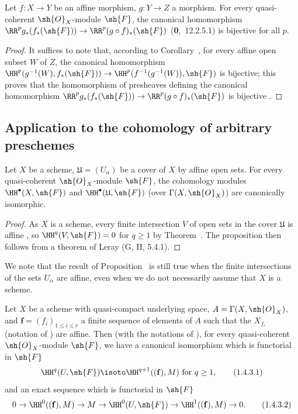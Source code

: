 \begin{corollary}[1.3.4]
\label{III.1.3.4}
Let $f:X\to Y$ be an affine morphism, $g:Y\to Z$ a morphism.
For every quasi-coherent $\sh{O}_X$-module $\sh{F}$, the canonical homomorphism $\RR^p g_*(f_*(\sh{F}))\to\RR^p(g\circ f)_*(\sh{F})$ (\textbf{0},~12.2.5.1) is bijective for all $p$.
\end{corollary}

\begin{proof}
It suffices to note that, according to Corollary~, for every affine open subset $W$ of $Z$, the canonical homomorphism $\HH^p(g^{-1}(W),f_*(\sh{F}))\to\HH^p(f^{-1}(g^{-1}(W)),\sh{F})$ is bijective; this proves that the homomorphism of presheaves defining the canonical homomorphism $\RR^p g_*(f_*(\sh{F}))\to\RR^p(g\circ f)_*(\sh{F})$ is bijective .
\end{proof}

\subsection{Application to the cohomology of arbitrary preschemes}
\label{subsection:III.1.4}

\begin{proposition}[1.4.1]
\label{III.1.4.1}
Let $X$ be a scheme, $\mathfrak{U}=(U_\alpha)$ be a cover of $X$ by affine open sets.
For every quasi-coherent $\sh{O}_X$-module $\sh{F}$, the cohomology modules $\HH^\bullet(X,\sh{F})$ and $\HH^\bullet(\mathfrak{U},\sh{F})$ (over $\Gamma(X,\sh{O}_X)$) are canonically isomorphic.
\end{proposition}

\begin{proof}
  As $X$ is a scheme, every finite intersection $V$ of open sets in the cover $\mathfrak{U}$ is affine , so $\HH^q(V,\sh{F})=0$ for $q\geq 1$ by Theorem~.
The proposition then follows from a theorem of Leray (G, II, 5.4.1).
\end{proof}

\begin{remark}[1.4.2]
\label{III.1.4.2}
We note that the result of Proposition~ is still true when the finite intersections of the sets $U_\alpha$ are affine, even when we do not necessarily assume that $X$ is a scheme.
\end{remark}

\begin{corollary}[1.4.3]
\label{III.1.4.3}
Let $X$ be a scheme with quasi-compact underlying space, $A=\Gamma(X,\sh{O}_X)$, and $\mathbf{f}=(f_i)_{1\leq i\leq r}$ a finite sequence of elements of $A$ such that the $X_{f_i}$ (notation of ) are affine.
Then (with the notations of ), for every quasi-coherent $\sh{O}_X$-module $\sh{F}$, we have a canonical isomorphism which is functorial in $\sh{F}$
\[
  \HH^q(U,\sh{F})\isoto\HH^{q+1}((\mathbf{f}),M)\text{ for }q\geq 1,
  \tag{1.4.3.1}\label{III.1.4.3.1}
\]
and an exact sequence which is functorial in $\sh{F}$
\[
  0\to\HH^0((\mathbf{f}),M)\to M\to\HH^0(U,\sh{F})\to\HH^1((\mathbf{f}),M)\to 0.
  \tag{1.4.3.2}
\]
\end{corollary}

